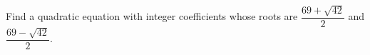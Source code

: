 Find a quadratic equation with integer coefficients whose roots are $\dfrac{69+\sqrt{42}}{2}$ and $\dfrac{69-\sqrt{42}}{2}$.
